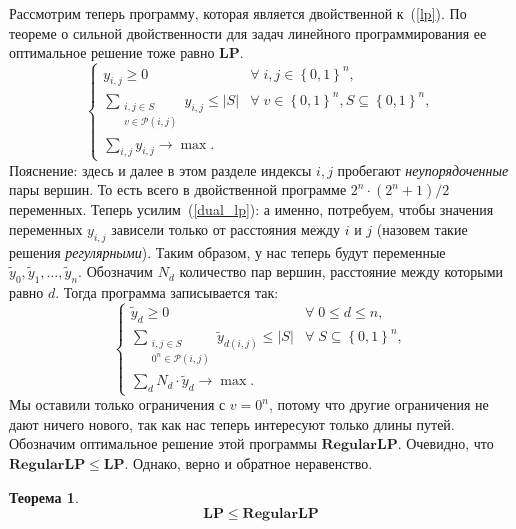 \documentclass[12pt]{article}
\newcommand{\set}[1]{\left\{#1\right\}}
\newcommand{\abs}[1]{\left|#1\right|}
\newcommand{\zo}{\set{0, 1}}
\newcommand{\Pc}{\mathcal{P}}
\newtheorem{theorem}{Теорема}
\begin{document}
    Рассмотрим теперь программу, которая является двойственной к~(\ref{lp}).
    По теореме о сильной двойственности для задач линейного программирования ее оптимальное решение тоже равно $\mathbf{LP}$.
    \begin{equation}
        \label{dual_lp}
        \begin{cases}
            y_{i,j} \geq 0 & \forall \; i, j \in \zo^n, \\ 
            \sum_{\begin{smallmatrix}i, j \in S \\ v \in \Pc(i, j)\end{smallmatrix}} y_{i,j} \leq \abs{S} & \forall \; v \in \zo^n, S \subseteq \zo^n,  \\
            \sum_{i,j} y_{i,j} \to \max.
        \end{cases}
    \end{equation}
    Пояснение: здесь и далее в этом разделе индексы $i, j$ пробегают \emph{неупорядоченные} пары вершин. То есть
    всего в двойственной программе $2^n \cdot (2^n + 1) / 2$ переменных.
    Теперь усилим~(\ref{dual_lp}): а именно, потребуем, чтобы значения переменных $y_{i,j}$ зависели только от расстояния между $i$ и $j$ (назовем такие
    решения \emph{регулярными}).
    Таким образом, у нас теперь будут переменные $\tilde{y}_0, \tilde{y}_1, \ldots, \tilde{y}_n$.
    Обозначим $N_d$ количество пар вершин, расстояние между которыми равно $d$. Тогда программа записывается так:
    \begin{equation}
        \label{regular_dual_lp}
        \begin{cases}
            \tilde{y}_d \geq 0 & \forall \; 0 \leq d \leq n, \\
            \sum_{\begin{smallmatrix}i, j \in S \\ 0^n \in \Pc(i, j)\end{smallmatrix}} \tilde{y}_{d(i, j)} \leq \abs{S} & \forall \; S \subseteq \zo^n, \\
            \sum_{d} N_d \cdot \tilde{y}_d \to \max.
        \end{cases}
    \end{equation}
    Мы оставили только ограничения с $v = 0^n$, потому что другие ограничения не дают ничего нового, так как нас теперь интересуют только длины путей.
    Обозначим оптимальное решение этой программы $\mathbf{RegularLP}$.
    Очевидно, что $\mathbf{RegularLP} \leq \mathbf{LP}$.
    Однако, верно и обратное неравенство.
    \begin{theorem}
        $$
            \mathbf{LP} \leq \mathbf{RegularLP}
        $$
    \end{theorem}
\end{document}
